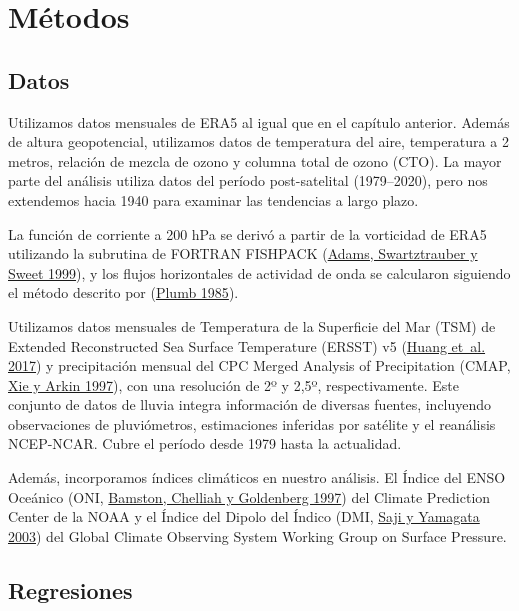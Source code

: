 \documentclass[12pt,oneside,a4paper]{reedthesis}
\begin{document}
\hypertarget{muxe9todos-1}{%
\section{Métodos}\label{muxe9todos-1}}

\hypertarget{datos-1}{%
\subsection{Datos}\label{datos-1}}

Utilizamos datos mensuales de ERA5 al igual que en el capítulo anterior.
Además de altura geopotencial, utilizamos datos de temperatura del aire, temperatura a 2 metros, relación de mezcla de ozono y columna total de ozono (CTO).
La mayor parte del análisis utiliza datos del período post-satelital (1979--2020), pero nos extendemos hacia 1940 para examinar las tendencias a largo plazo.

La función de corriente a 200 hPa se derivó a partir de la vorticidad de ERA5 utilizando la subrutina de FORTRAN FISHPACK (\protect\hyperlink{ref-fishpack}{Adams, Swartztrauber y Sweet 1999}), y los flujos horizontales de actividad de onda se calcularon siguiendo el método descrito por (\protect\hyperlink{ref-plumb1985}{Plumb 1985}).

Utilizamos datos mensuales de Temperatura de la Superficie del Mar (TSM) de Extended Reconstructed Sea Surface Temperature (ERSST) v5 (\protect\hyperlink{ref-huang2017}{Huang et~al. 2017}) y precipitación mensual del CPC Merged Analysis of Precipitation (CMAP, \protect\hyperlink{ref-xie1997}{Xie y Arkin 1997}), con una resolución de 2º y 2,5º, respectivamente.
Este conjunto de datos de lluvia integra información de diversas fuentes, incluyendo observaciones de pluviómetros, estimaciones inferidas por satélite y el reanálisis NCEP-NCAR.
Cubre el período desde 1979 hasta la actualidad.

Además, incorporamos índices climáticos en nuestro análisis.
El Índice del ENSO Oceánico (ONI, \protect\hyperlink{ref-bamston1997}{Bamston, Chelliah y Goldenberg 1997}) del Climate Prediction Center de la NOAA y el Índice del Dipolo del Índico (DMI, \protect\hyperlink{ref-saji2003}{Saji y Yamagata 2003}) del Global Climate Observing System Working Group on Surface Pressure.

\hypertarget{regresiones}{%
\subsection{Regresiones}\label{regresiones}}
\end{document}
